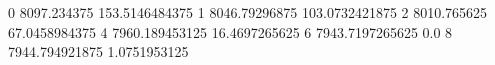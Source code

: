 0 8097.234375 153.5146484375
1 8046.79296875 103.0732421875
2 8010.765625 67.0458984375
4 7960.189453125 16.4697265625
6 7943.7197265625 0.0
8 7944.794921875 1.0751953125
